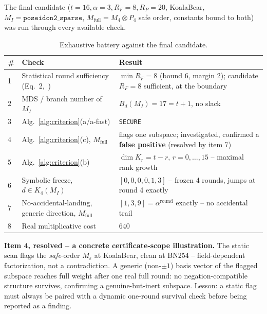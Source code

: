 \documentclass[conference]{IEEEtran}
\theoremstyle{definition}
\theoremstyle{plain}
\begin{document}
The final candidate ($t=16,\alpha=3,R_F=8,R_P=20$, KoalaBear,
$M_I=\texttt{poseidon2\_sparse}$, $M_{\mathrm{full}}=M_4\otimes P_4$
safe order, constants bound to both) was run through every available
check.

\begin{table}[t]
\centering
\caption{Exhaustive battery against the final candidate.}
\label{tab:battery}
\small
\begin{tabularx}{\columnwidth}{@{}p{}Xp{}@{}}
\toprule
\# & Check & Result \\
\midrule
1 & Statistical round sufficiency (Eq.~2,~\cite{poseidon2021}) & $\min
R_F=8$ (bound 6, margin 2); candidate $R_F=8$ sufficient, at the
boundary \\
2 & MDS / branch number of $M_I$ & $B_d(M_I)=17=t+1$, no slack \\
3 & Alg.~\ref{alg:criterion}(a/a-fast) & \texttt{SECURE} \\
4 & Alg.~\ref{alg:criterion}(c), $M_{\mathrm{full}}$ & flags one
subspace; investigated, confirmed a \textbf{false positive} (resolved
by item 7) \\
5 & Alg.~\ref{alg:criterion}(b) & $\dim K_r=t-r$, $r=0,\ldots,15$ --
maximal rank growth \\
6 & Symbolic freeze, $d\in K_4(M_I)$ & $[0,0,0,0,1,3]$ -- frozen 4
rounds, jumps at round 4 exactly \\
7 & No-accidental-landing, generic direction, $M_{\mathrm{full}}$ &
$[1,3,9]=\alpha^{\text{round}}$ exactly -- no accidental trail \\
8 & Real multiplicative cost & $640$ \\
\bottomrule
\end{tabularx}
\end{table}

\textbf{Item 4, resolved -- a concrete certificate-scope illustration.}
The static scan flags the \emph{safe}-order $\bar M_\varepsilon$ at
KoalaBear, clean at BN254 -- field-dependent factorization, not a
contradiction. A generic (non-$\pm1$) basis vector of the flagged
subspace reaches full weight after one real full round: no
negation-compatible structure survives, confirming a genuine-but-inert
subspace. Lesson: a static flag must always be paired with a dynamic
one-round survival check before being reported as a finding.
\end{document}
